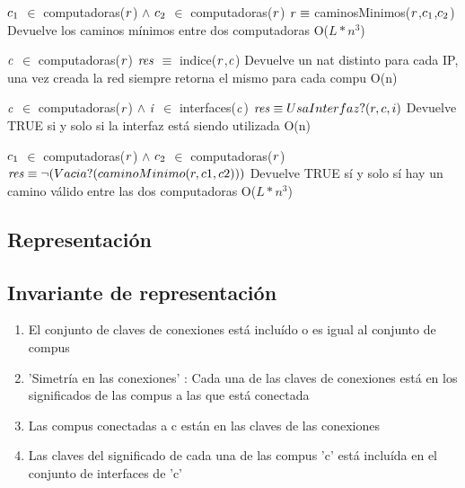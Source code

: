  {$\text{\textit{$c_{1}$}}$ $\in$ computadoras($\text{\textit{r}}$) $\land$ $\text{\textit{$c_{2}$}}$ $\in$ computadoras($\text{\textit{r}}$)}
 {$\text{\textit{r}} \equiv$ caminosMinimos($\text{\textit{r}}$,$\text{\textit{$c_{1}$}}$,$\text{\textit{$c_{2}$}}$)}
 {Devuelve los caminos mínimos entre dos computadoras}
 {O($L*n^3$)}

 {$\text{\textit{c}}$ $\in$ computadoras($\text{\textit{r}}$)}
 {$\text{\textit{res}}$ $\equiv$ indice($\text{\textit{r}}$,$\text{\textit{c}}$)}
 {Devuelve un nat distinto para cada IP, una vez creada la red siempre retorna el mismo para cada compu}
 {O(n)}

 {$\text{\textit{c}}$ $\in$ computadoras($\text{\textit{r}}$) $\land$ $\text{\textit{i}}$ $\in$ interfaces($\text{\textit{c}}$)}
 {$\text{\textit{res}} \equiv UsaInterfaz?(r,c,i)$}
 {Devuelve TRUE si y solo si la interfaz está siendo utilizada}
 {O(n)}

 {$\text{\textit{$c_{1}$}}$ $\in$ computadoras($\text{\textit{r}}$) $\land$ $\text{\textit{$c_{2}$}}$ $\in$ computadoras($\text{\textit{r}}$)}
 {$\text{\textit{res}} \equiv \neg(Vacia?(caminoMinimo(r,c1,c2)))$}
 {Devuelve TRUE sí y solo sí hay un camino válido entre las dos computadoras}
 {O($L*n^3$)}

\subsection{Representación}

\subsection{Invariante de representación}
\begin{enumerate}
\item El conjunto de claves de conexiones está incluído o es igual al conjunto de compus
\item 'Simetría en las conexiones' : Cada una de las claves de conexiones está en los significados de las compus a las que está conectada
\item Las compus conectadas a c están en las claves de las conexiones
\item Las claves del significado de cada una de las compus 'c' está incluída en el conjunto de interfaces de 'c'
\end{enumerate}

